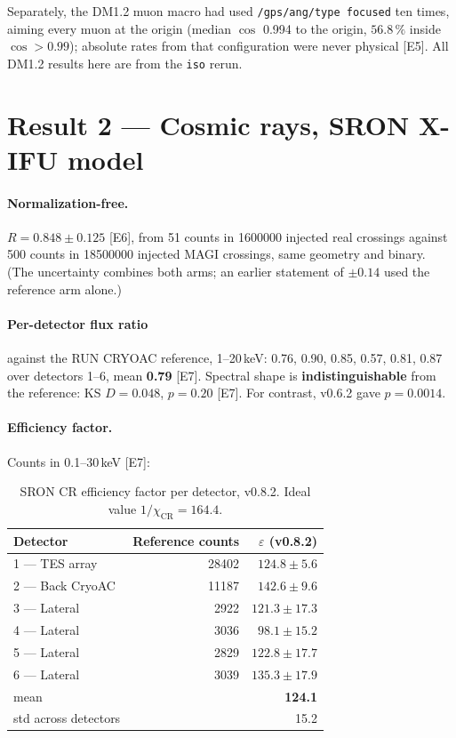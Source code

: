 \documentclass[11pt,a4paper]{article}
\newcommand{\ev}[1]{{\footnotesize\textcolor{prov}{[#1]}}}
\begin{document}
Separately, the DM1.2 muon macro had used \texttt{/gps/ang/type focused} ten
times, aiming every muon at the origin (median $\cos$ 0.994 to the origin,
$56.8\,\%$ inside $\cos>0.99$); absolute rates from that configuration were
never physical \ev{E5}. All DM1.2 results here are from the \texttt{iso}
rerun.

\section{Result 2 --- Cosmic rays, SRON X-IFU model}
\label{sec:cr}

\paragraph{Normalization-free.}
$R = \mathbf{0.848 \pm 0.125}$ \ev{E6}, from 51 counts in \num{1600000}
injected real crossings against 500 counts in \num{18500000} injected MAGI
crossings, same geometry and binary. (The uncertainty combines both arms; an
earlier statement of $\pm0.14$ used the reference arm alone.)

\paragraph{Per-detector flux ratio} against the RUN CRYOAC reference, 1--20\,keV:
0.76, 0.90, 0.85, 0.57, 0.81, 0.87 over detectors 1--6, mean \textbf{0.79}
\ev{E7}. Spectral shape is \textbf{indistinguishable} from the reference:
KS $D = 0.048$, $p = 0.20$ \ev{E7}. For contrast, v0.6.2 gave $p = 0.0014$.

\paragraph{Efficiency factor.} Counts in 0.1--30\,keV \ev{E7}:

\begin{table}[h]
\centering
\caption{SRON CR efficiency factor per detector, v0.8.2. Ideal value
$1/\chi_{\mathrm{CR}} = 164.4$.}
\begin{tabular}{lrr}
\toprule
Detector & Reference counts & $\varepsilon$ (v0.8.2) \\
\midrule
1 --- TES array     & \num{28402} & $124.8 \pm 5.6$ \\
2 --- Back CryoAC   & \num{11187} & $142.6 \pm 9.6$ \\
3 --- Lateral       & \num{2922}  & $121.3 \pm 17.3$ \\
4 --- Lateral       & \num{3036}  & $98.1 \pm 15.2$ \\
5 --- Lateral       & \num{2829}  & $122.8 \pm 17.7$ \\
6 --- Lateral       & \num{3039}  & $135.3 \pm 17.9$ \\
\midrule
mean                &             & \textbf{124.1} \\
std across detectors&             & 15.2 \\
\bottomrule
\end{tabular}
\end{table}
\end{document}
